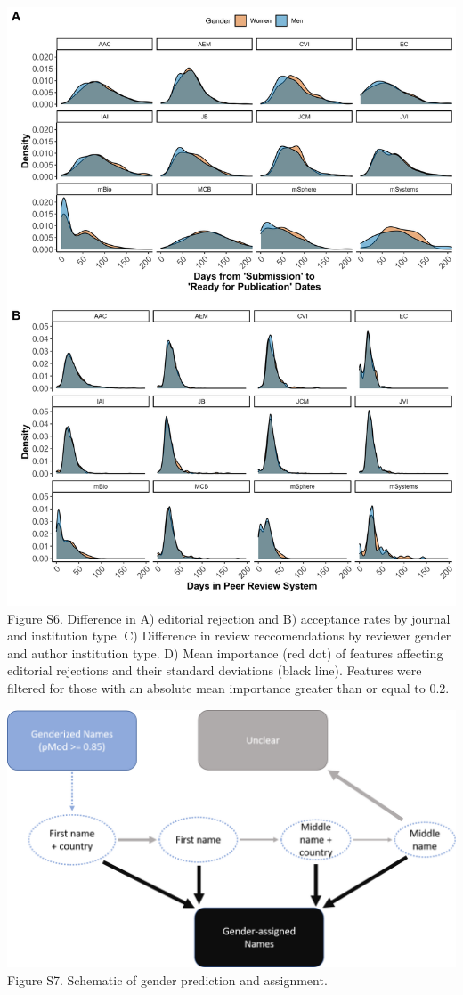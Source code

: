 \documentclass[11pt,]{article}
\begin{document}
\includegraphics{Figure_S6.png} Figure S6. Difference in A) editorial
rejection and B) acceptance rates by journal and institution type. C)
Difference in review reccomendations by reviewer gender and author
institution type. D) Mean importance (red dot) of features affecting
editorial rejections and their standard deviations (black line).
Features were filtered for those with an absolute mean importance
greater than or equal to 0.2.

\newpage

\includegraphics{genderize_method.png} Figure S7. Schematic of gender
prediction and assignment.
\end{document}
